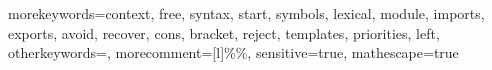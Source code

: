  {
	morekeywords={context, free, syntax, start, symbols, lexical, module, imports, exports, avoid, recover, cons, bracket, reject, templates, priorities, left},
	otherkeywords={},
	morecomment=[l]{\%\%},
	sensitive=true,
	mathescape=true
}

\newcommand{\sdfcode}[1]{\lstinline[language=SDF,basicstyle=\lstinlinestyle,breaklines=false]{#1}}
\newcommand{\sdfcodebl}[1]{\lstinline[language=SDF,basicstyle=\lstinlinestyle,breaklines=true]{#1}}
\newcommand{\SDF}{\langname{SDF}}
